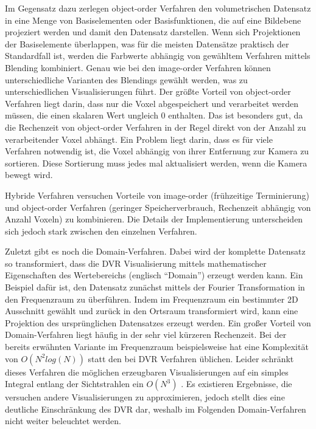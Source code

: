 \documentclass[a4paper,fontsize=12pt,toc=bib,halfparskip]{scrartcl}
\begin{document}
Im Gegensatz dazu zerlegen object-order Verfahren den volumetrischen Datensatz in eine Menge von Basiselementen oder Basisfunktionen, die auf eine Bildebene projeziert werden und damit den Datensatz darstellen. Wenn sich Projektionen der Basiselemente \"uberlappen, was f\"ur die meisten Datens\"atze praktisch der Standardfall ist, werden die Farbwerte abh\"angig von gew\"ahltem Verfahren mittels Blending kombiniert. Genau wie bei den image-order Verfahren k\"onnen unterschiedliche Varianten des Blendings gew\"ahlt werden, was zu unterschiedlichen Visualisierungen f\"uhrt. Der gr\"o{\ss}te Vorteil von object-order Verfahren liegt darin, dass nur die Voxel abgespeichert und verarbeitet werden m\"ussen, die einen skalaren Wert ungleich 0 enthalten. Das ist besonders gut, da die Rechenzeit von object-order Verfahren in der Regel direkt von der Anzahl zu verarbeitender Voxel abh\"angt. Ein Problem liegt darin, dass es f\"ur viele Verfahren notwendig ist, die Voxel abh\"angig von ihrer Entfernung zur Kamera zu sortieren. Diese Sortierung muss jedes mal aktualisiert werden, wenn die Kamera bewegt wird.

Hybride Verfahren versuchen Vorteile von image-order (fr\"uhzeitige Terminierung) und object-order Verfahren (geringer Speicherverbrauch, Rechenzeit abh\"angig von Anzahl Voxeln) zu kombinieren. Die Details der Implementierung unterscheiden sich jedoch stark zwischen den einzelnen Verfahren. 

Zuletzt gibt es noch die Domain-Verfahren. Dabei wird der komplette Datensatz so transformiert, dass die DVR Visualisierung mittels mathematischer Eigenschaften des Wertebereichs (englisch ``Domain'') erzeugt werden kann. Ein Beispiel daf\"ur ist, den Datensatz zun\"achst mittels der Fourier Transformation in den Frequenzraum zu \"uberf\"uhren. Indem im Frequenzraum ein bestimmter 2D Ausschnitt gew\"ahlt und zur\"uck in den Ortsraum transformiert wird, kann eine Projektion des urspr\"unglichen Datensatzes erzeugt werden. Ein gro{\ss}er Vorteil von Domain-Verfahren liegt h\"aufig in der sehr viel k\"urzeren Rechenzeit. Bei der bereits erw\"ahnten Variante im Frequenzraum beispielsweise hat eine Komplexit\"at von $O(N^2 log(N))$ statt den bei DVR Verfahren \"ublichen. Leider schr\"ankt dieses Verfahren die m\"oglichen erzeugbaren Visualisierungen auf ein simples Integral entlang der Sichtstrahlen ein $O(N^3)$ \cite[S.~143]{hansen2005visualization}. Es existieren Ergebnisse, die versuchen andere Visualisierungen zu approximieren, jedoch stellt dies eine deutliche Einschr\"ankung des DVR dar, weshalb im Folgenden Domain-Verfahren nicht weiter beleuchtet werden.
\end{document}

